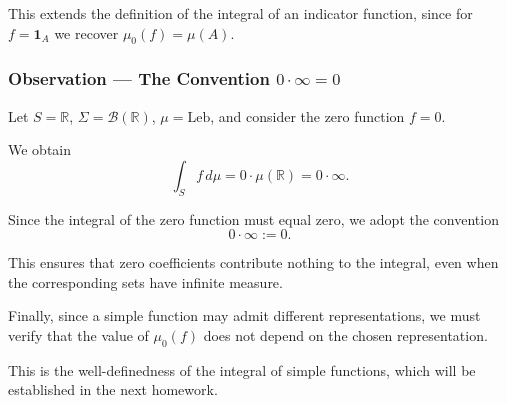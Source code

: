 This extends the definition of the integral of an indicator function, since for $f=\mathbf{1}_A$ we recover $\mu_0(f)=\mu(A)$.

\subsubsection*{Observation --- The Convention $0\cdot\infty=0$}%
%


Let $S=\mathbb R$, $\Sigma=\mathcal B(\mathbb R)$, $\mu=\mathrm{Leb}$, and consider the zero function $f=0$.

We obtain
\[
\int_S f\,d\mu
=0\cdot\mu(\mathbb R)
=0\cdot\infty.
\]

Since the integral of the zero function must equal zero, we adopt the convention
\[
0\cdot\infty:=0.
\]

This ensures that zero coefficients contribute nothing to the integral, even when the corresponding sets have infinite measure.

Finally, since a simple function may admit different representations, we must verify that the value of $\mu_0(f)$ does not depend on the chosen representation.

This is the well-definedness of the integral of simple functions, which will be established in the next homework.
